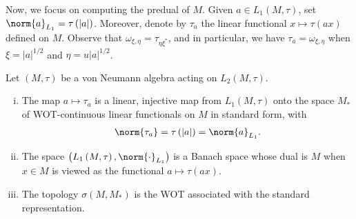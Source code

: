 \documentclass[10pt]{mypackage}
\begin{document}
Now, we focus on computing the predual of $M$. Given $a\in L_1\left( M,\tau \right)$, set $\norm{a}_{L_1} = \tau\left( \left\vert a \right\vert \right)$. Moreover, denote by $\tau_a$ the linear functional $x\mapsto \tau\left( ax \right)$ defined on $M$. Observe that $\omega_{\xi,\eta} = \tau_{\eta\xi^{\ast}}$, and in particular, we have $\tau_{a} = \omega_{\xi,\eta}$ when $\xi = \left\vert a \right\vert^{1/2}$ and $\eta = u \left\vert a \right\vert^{1/2}$.
\begin{theorem}
  Let $\left( M,\tau \right)$ be a von Neumann algebra acting on $L_2\left( M,\tau \right)$.
  \begin{enumerate}[(i)]
    \item The map $a\mapsto \tau_a$ is a linear, injective map from $L_1\left( M,\tau \right)$ onto the space $M_{\ast}$ of WOT-continuous linear functionals on $M$ in standard form, with
      \begin{align*}
        \norm{\tau_a} = \tau\left( \left\vert a \right\vert \right) = \norm{a}_{L_1}.
      \end{align*}
    \item The space $\left( L_1\left( M,\tau \right),\norm{\cdot}_{L_1} \right)$ is a Banach space whose dual is $M$ when $x\in M$ is viewed as the functional $a\mapsto \tau\left( ax \right)$.
    \item The topology $\sigma\left( M,M_{\ast} \right)$ is the WOT associated with the standard representation.
  \end{enumerate}
\end{theorem}
\end{document}
